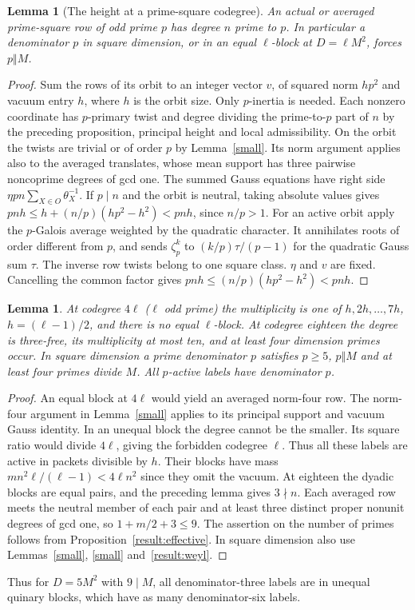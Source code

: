 \documentclass[11pt]{amsart}
\numberwithin{equation}{section}
\newtheorem{lemma}[theorem]{Lemma}
\theoremstyle{definition}
\theoremstyle{plain}
\begin{document}
\begin{lemma}[The height at a prime-square codegree]\label{result:height}
An actual or averaged prime-square row of odd prime $p$ has degree
$n$ prime to $p$. In particular a denominator $p$ in square dimension,
or in an equal $\ell$-block at $D=\ell M^2$, forces $p\Vert M$.
\end{lemma}
\begin{proof}
Sum the rows of its orbit to an integer vector $v$, of squared norm
$hp^2$ and vacuum entry $h$, where $h$ is the orbit size. Only
$p$-inertia is needed. Each nonzero coordinate has $p$-primary twist
and degree dividing the prime-to-$p$ part of $n$ by the preceding
proposition, principal height and local admissibility. On the orbit
the twists are trivial or of order $p$ by Lemma~\ref{small}.
Its norm argument applies also to the averaged translates, whose mean
support has three pairwise noncoprime degrees of gcd one.
The summed Gauss equations have right side
$\eta pn\sum_{X\in O}\theta_X^{-1}$. If $p\mid n$ and the orbit is
neutral, taking absolute values gives
$ pnh\le h+(n/p)(hp^2-h^2)<pnh$, since $n/p>1$.
For an active orbit apply the $p$-Galois average weighted by the
quadratic character. It annihilates roots of order different from
$p$, and sends $\zeta_p^k$ to $(k/p)\tau/(p-1)$ for the quadratic
Gauss sum $\tau$. The inverse row twists belong to one square class.
$\eta$ and $v$ are fixed. Cancelling the common factor gives
$pnh\le (n/p)(hp^2-h^2)<pnh$.
\end{proof}

\begin{lemma}\label{result:small-effective}
At codegree $4\ell$ ($\ell$ odd prime) the multiplicity is one of
$h,2h,\ldots,7h$, $h=(\ell-1)/2$, and there is no equal $\ell$-block.
At codegree eighteen the degree is three-free, its multiplicity at most
ten, and at least four dimension primes occur. In square dimension a
prime denominator $p$ satisfies $p\ge5$, $p\Vert M$ and at least four
primes divide $M$. All $p$-active labels have denominator $p$.
\end{lemma}
\begin{proof}
An equal block at $4\ell$ would yield an averaged norm-four row.
The norm-four argument in Lemma~\ref{small} applies to its principal support and vacuum Gauss identity.
In an unequal block the degree cannot be the smaller. Its square
ratio would divide $4\ell$, giving the forbidden codegree $\ell$.
Thus all these labels are active in packets divisible by $h$. Their
blocks have mass $mn^2\ell/(\ell-1)<4\ell n^2$ since they omit the
vacuum. At eighteen the dyadic blocks are equal pairs, and the
preceding lemma gives $3\nmid n$. Each averaged row meets the neutral
member of each pair and at least three distinct proper nonunit degrees
of gcd one, so $1+m/2+3\le9$. The assertion on the number of primes
follows from Proposition~\ref{result:effective}. In square dimension
also use Lemmas~\ref{small}, \ref{small} and~\ref{result:weyl}.
\end{proof}
Thus for $D=5M^2$ with $9\mid M$, all denominator-three labels are in
unequal quinary blocks, which have as many denominator-six labels.
\end{document}
